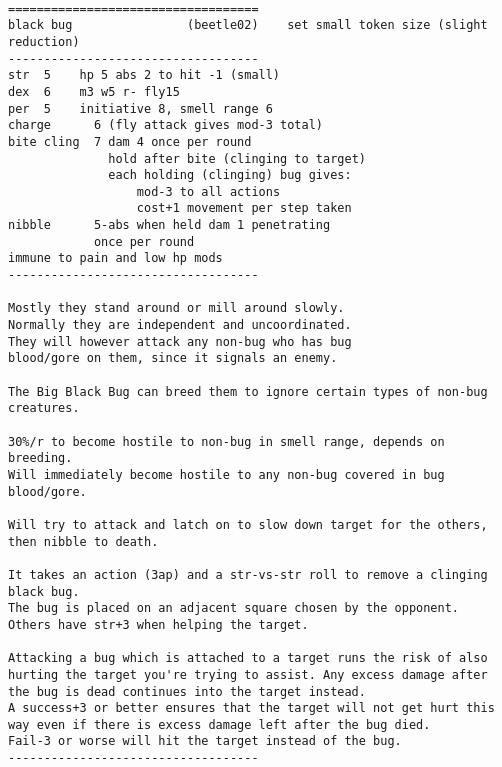 \

\goodbreak \begin{samepage} \small \begin{verbatim}
===================================
black bug                (beetle02)    set small token size (slight reduction)
-----------------------------------
str  5    hp 5 abs 2 to hit -1 (small)
dex  6    m3 w5 r- fly15
per  5    initiative 8, smell range 6
charge      6 (fly attack gives mod-3 total)
bite cling  7 dam 4 once per round
              hold after bite (clinging to target)
              each holding (clinging) bug gives:
                  mod-3 to all actions
                  cost+1 movement per step taken
nibble      5-abs when held dam 1 penetrating
            once per round
immune to pain and low hp mods
-----------------------------------

Mostly they stand around or mill around slowly.
Normally they are independent and uncoordinated.
They will however attack any non-bug who has bug
blood/gore on them, since it signals an enemy.

The Big Black Bug can breed them to ignore certain types of non-bug creatures.

30%/r to become hostile to non-bug in smell range, depends on breeding.
Will immediately become hostile to any non-bug covered in bug blood/gore.

Will try to attack and latch on to slow down target for the others,
then nibble to death.

It takes an action (3ap) and a str-vs-str roll to remove a clinging black bug.
The bug is placed on an adjacent square chosen by the opponent.
Others have str+3 when helping the target.

Attacking a bug which is attached to a target runs the risk of also
hurting the target you're trying to assist. Any excess damage after
the bug is dead continues into the target instead.
A success+3 or better ensures that the target will not get hurt this
way even if there is excess damage left after the bug died.
Fail-3 or worse will hit the target instead of the bug.
-----------------------------------
\end{verbatim} \normalsize \end{samepage}

\


